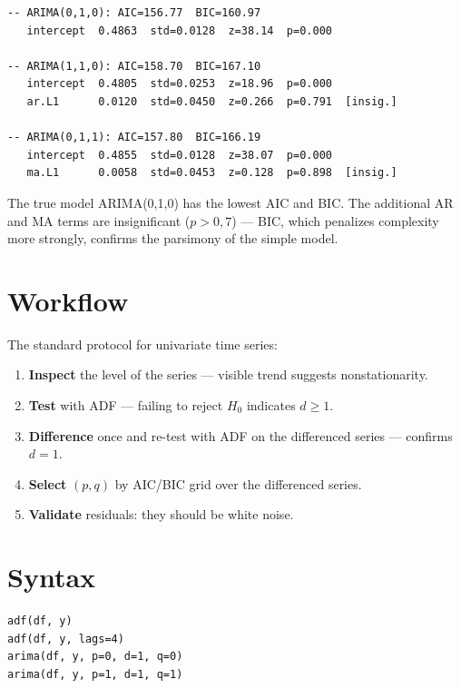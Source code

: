 \begin{lstlisting}[language={}, basicstyle=\ttfamily\small,
  frame=none, numbers=none, backgroundcolor=\color{codbg},
  xleftmargin=0pt, xrightmargin=0pt, breaklines=false]
-- ARIMA(0,1,0): AIC=156.77  BIC=160.97
   intercept  0.4863  std=0.0128  z=38.14  p=0.000

-- ARIMA(1,1,0): AIC=158.70  BIC=167.10
   intercept  0.4805  std=0.0253  z=18.96  p=0.000
   ar.L1      0.0120  std=0.0450  z=0.266  p=0.791  [insig.]

-- ARIMA(0,1,1): AIC=157.80  BIC=166.19
   intercept  0.4855  std=0.0128  z=38.07  p=0.000
   ma.L1      0.0058  std=0.0453  z=0.128  p=0.898  [insig.]
\end{lstlisting}

The true model ARIMA(0,1,0) has the lowest AIC and BIC. The additional AR and MA
terms are insignificant ($p > 0{,}7$) --- BIC, which penalizes complexity more
strongly, confirms the parsimony of the simple model.

\section{Workflow}

The standard protocol for univariate time series:

\begin{enumerate}
  \item \textbf{Inspect} the level of the series --- visible trend suggests
        nonstationarity.
  \item \textbf{Test} with ADF --- failing to reject $H_0$ indicates $d \geq 1$.
  \item \textbf{Difference} once and re-test with ADF on the differenced series
        --- confirms $d=1$.
  \item \textbf{Select} $(p,q)$ by AIC/BIC grid over the differenced series.
  \item \textbf{Validate} residuals: they should be white noise.
\end{enumerate}

\section{Syntax}

\begin{lstlisting}
adf(df, y)
adf(df, y, lags=4)
arima(df, y, p=0, d=1, q=0)
arima(df, y, p=1, d=1, q=1)
\end{lstlisting}

